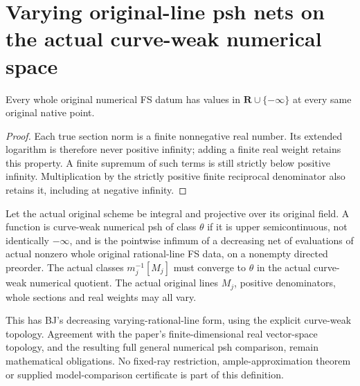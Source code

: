 \section{Varying original-line psh nets on the actual curve-weak numerical space}
\label{sec:native-numerical-curve-weak-psh}

\begin{theorem}
\label{thm:native-numerical-fs-ne-top}
\leanok
{}
Every whole original numerical FS datum has values in
$\mathbf R\cup\{-\infty\}$ at every same original native point.
\end{theorem}
\begin{proof}
Each true section norm is a finite nonnegative real number. Its extended
logarithm is therefore never positive infinity; adding a finite real
weight retains this property. A finite supremum of such terms is still
strictly below positive infinity. Multiplication by the strictly positive
finite reciprocal denominator also retains it, including at negative
infinity.
\end{proof}

\begin{definition}
\label{def:native-numerical-curve-weak-psh}
\leanok
{}
Let the actual original scheme be integral and projective over its original
field. A function is curve-weak numerical psh of class $\theta$ if it is
upper semicontinuous, not identically $-\infty$, and is the pointwise
infimum of a decreasing net of evaluations of actual nonzero whole
original rational-line FS data, on a nonempty directed preorder. The
actual classes $m_j^{-1}[M_j]$ must converge to $\theta$ in the actual
curve-weak numerical quotient. The actual original lines $M_j$, positive
denominators, whole sections and real weights may all vary.

This has BJ's decreasing varying-rational-line form, using the explicit
curve-weak topology. Agreement with the paper's finite-dimensional real
vector-space topology, and the resulting full general numerical psh
comparison, remain mathematical obligations. No fixed-ray restriction,
ample-approximation theorem or supplied model-comparison certificate is
part of this definition.
\end{definition}

